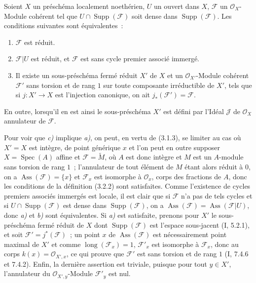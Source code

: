 \begin{proposition}[3.2.3]
\label{IV.2.3.2.3-fr}
Soient $X$ un préschéma localement noethérien, $U$ un ouvert dans $X$,
$\mathcal F$ un $\mathcal O_X$-Module cohérent tel que
$U\cap\operatorname{Supp}(\mathcal F)$ soit dense dans
$\operatorname{Supp}(\mathcal F)$. Les conditions suivantes sont
équivalentes~:
\begin{enumerate}
\item[\emph{a)}] $\mathcal F$ est réduit.
\item[\emph{b)}] $\mathcal F|U$ est réduit, et $\mathcal F$ est sans cycle
premier associé immergé.
\item[\emph{c)}] Il existe un sous-préschéma fermé réduit $X'$ de $X$ et un
$\mathcal O_{X'}$-Module cohérent $\mathcal F'$ sans torsion et de rang $1$
sur toute composante irréductible de $X'$, tels que si $j:X'\to X$ est
l'injection canonique, on ait $j_*(\mathcal F')=\mathcal F$.
\end{enumerate}
En outre, lorsqu'il en est ainsi le sous-préschéma $X'$ est défini par l'Idéal
$\mathcal J$ de $\mathcal O_X$ annulateur de $\mathcal F$.
\end{proposition}

Pour voir que \emph{c)} implique \emph{a)}, on peut, en vertu de (3.1.3), se
limiter au cas où $X'=X$ est intègre, de point générique $x$ et l'on peut en
outre supposer $X=\operatorname{Spec}(A)$ affine et
$\mathcal F=\widetilde M$, où $A$ est donc intègre et $M$ est un $A$-module
sans torsion de rang $1$~; l'annulateur de tout élément de $M$ étant alors
réduit à $0$, on a $\operatorname{Ass}(\mathcal F)=\{x\}$ et
$\mathcal F_x$ est isomorphe à $\mathcal O_x$, corps des fractions de $A$,
donc les conditions de la définition (3.2.2) sont satisfaites. Comme
l'existence de cycles premiers associés immergés est locale, il est clair que
si $\mathcal F$ n'a pas de tels cycles et si
$U\cap\operatorname{Supp}(\mathcal F)$ est dense dans
$\operatorname{Supp}(\mathcal F)$, on a
$\operatorname{Ass}(\mathcal F)=\operatorname{Ass}(\mathcal F|U)$, donc
\emph{a)} et \emph{b)} sont équivalentes. Si \emph{a)} est satisfaite,
prenons pour $X'$ le sous-préschéma fermé réduit de $X$ dont
$\operatorname{Supp}(\mathcal F)$ est l'espace sous-jacent (I, 5.2.1), et soit
$\mathcal F'=j^*(\mathcal F)$~; un point $x$ de
$\operatorname{Ass}(\mathcal F)$ est nécessairement point maximal de $X'$ et
comme $\operatorname{long}(\mathcal F_x)=1$, $\mathcal F'_x$ est isomorphe à
$\mathcal F_x$, donc au corps $k(x)=\mathcal O_{X',x}$, ce qui prouve que
$\mathcal F'$ est sans torsion et de rang $1$ (I, 7.4.6 et 7.4.2). Enfin, la
dernière assertion est triviale, puisque pour tout $y\in X'$, l'annulateur du
$\mathcal O_{X',y}$-Module $\mathcal F'_y$ est nul.

